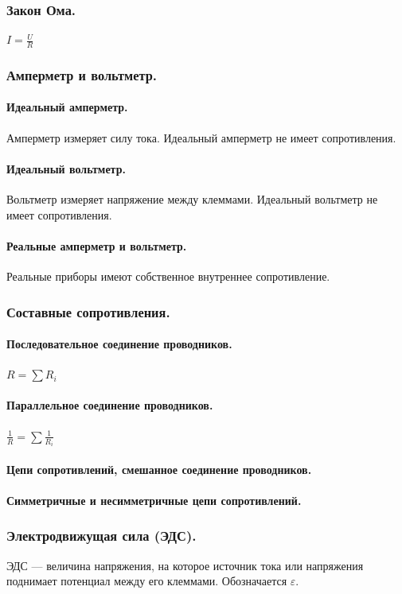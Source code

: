 \documentclass{article}
\begin{document}
        \subsubsection{Закон Ома.}
                \(I = \frac{U}{R}\)
        \subsubsection{Амперметр и вольтметр.}
            \paragraph{Идеальный амперметр.}
                Амперметр измеряет силу тока. Идеальный амперметр не имеет сопротивления.
            \paragraph{Идеальный вольтметр.}
                Вольтметр измеряет напряжение между клеммами. Идеальный вольтметр не имеет сопротивления.
            \paragraph{Реальные амперметр и вольтметр.}
                Реальные приборы имеют собственное внутреннее сопротивление.
        \subsubsection{Составные сопротивления.}
            \paragraph{Последовательное соединение проводников.}
                \(R = \sum{R_i}\)
            \paragraph{Параллельное соединение проводников.}
                \(\frac{1}{R} = \sum{\frac{1}{R_i}}\)
            \paragraph{Цепи сопротивлений, смешанное соединение проводников.}
            \paragraph{Симметричные и несимметричные цепи сопротивлений.}
        \subsubsection{Электродвижущая сила (ЭДС).}
                ЭДС --- величина напряжения, на которое источник тока или напряжения поднимает потенциал между его клеммами. Обозначается \(\varepsilon\).
\end{document}
